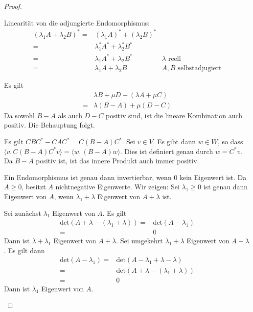\begin{proof}
	\begin{parts}
	\item Linearität von die adjungierte Endomorphismus:
		\begin{align*}
			(\lambda_1A+\lambda_2 B)^*=&(\lambda_1 A)^*+(\lambda_2 B)^*\\
			=&\lambda_1^* A^*+\lambda_2^* B^*\\
			=&\lambda_1 A^*+\lambda_2 B^* & \lambda\text{ reell}\\
			=&\lambda_1 A+\lambda_2 B & A,B\text{ selbstadjugiert}
		\end{align*}
	\item Es gilt
		\begin{align*}
			&\lambda B+\mu D-(\lambda A +\mu C)\\
			=&\lambda(B-A)+\mu(D-C)
		\end{align*}
		Da sowohl $B-A$ als auch $D-C$ positiv sind, ist die lineare Kombination auch positiv. Die Behauptung folgt.
	\item Es gilt $CBC^*-CAC^*=C(B-A)C^*$. Sei $v\in V$. Es gibt dann $w\in W$, so dass $\langle v, C(B-A)C^* v\rangle= \langle w, (B-A)w\rangle$. Dies ist definiert genau durch $w=C^*v$. Da $B-A$ positiv ist, ist das innere Produkt auch immer positiv. 
	\item Ein Endomorphismus ist genau dann invertierbar, wenn $0$ kein Eigenwert ist. Da $A\ge 0$, besitzt $A$ nichtnegative Eigenwerte. Wir zeigen: Sei $\lambda_1\ge 0$ ist genau dann Eigenwert von $A$, wenn $\lambda_1+\lambda$ Eigenwert von $A+\lambda$ ist.
		
		Sei zunächst $\lambda_1$ Eigenwert von $A$. Es gilt
		\begin{align*}
			\text{det}(A+\lambda-(\lambda_1+\lambda))=&\text{det}(A-\lambda_1)\\
			=& 0
		\end{align*}
		Dann ist $\lambda+\lambda_1$ Eigenwert von $A+\lambda$. Sei umgekehrt $\lambda_1+\lambda$ Eigenwert von $A+\lambda$. Es gilt dann
		\begin{align*}
			\text{det}(A-\lambda_1)=&\text{det}(A-\lambda_1+\lambda-\lambda)\\
			=&\text{det}(A+\lambda-(\lambda_1+\lambda))\\
			=&0
		\end{align*}
		Dann ist $\lambda_1$ Eigenwert von $A$.


\end{parts}
\end{proof}
